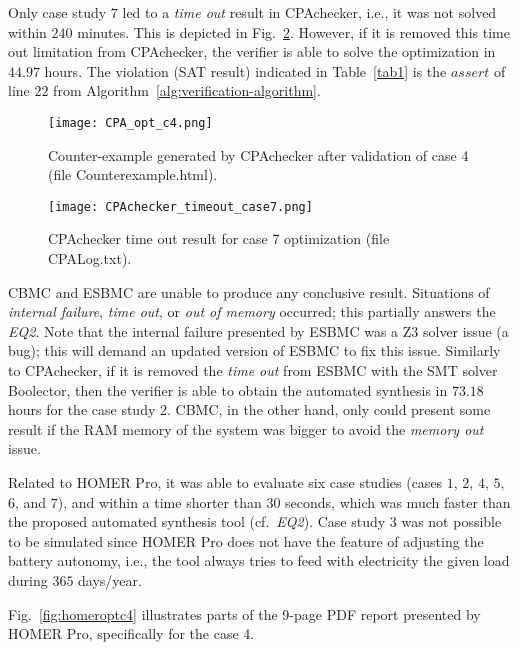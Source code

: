 Only case study $7$ led to a \textit{time out} result in CPAchecker, i.e., 
it was not solved within $240$ minutes. This is depicted in Fig.~\ref{fig:cpaoptcase7}. However, if it is removed this time out limitation from CPAchecker, the verifier is 
able to solve the optimization in $44.97$ hours. 
The violation (SAT result) indicated in Table~\ref{tab1} 
is the $assert$ of line $22$ from Algorithm~\ref{alg:verification-algorithm}. %

\begin{figure}[h]
\texttt{[image: CPA\_opt\_c4.png]}
\centering
\caption{Counter-example generated by CPAchecker after validation of case 4 (file Counterexample.html).}
\label{fig:CPAoptc1}
\end{figure}

\begin{figure}[h]
\texttt{[image: CPAchecker\_timeout\_case7.png]}
\centering
\caption{CPAchecker time out result for case 7 optimization (file CPALog.txt).}
\label{fig:cpaoptcase7}
\end{figure}

CBMC and ESBMC are unable to produce any conclusive result. 
Situations of \textit{internal failure}, \textit{time out}, 
or \textit{out of memory} occurred; this partially answers 
the \textit{EQ2}. Note that the internal failure presented 
by ESBMC was a Z3 solver issue (a bug); this will demand 
an updated version of ESBMC to fix this issue. Similarly to CPAchecker, 
if it is removed the \textit{time out} from ESBMC with the SMT solver Boolector, 
then the verifier is able to obtain the automated synthesis 
in $73.18$ hours for the case study $2$. CBMC, in the other hand, only could present some result if the RAM memory of the system was bigger to avoid the \textit{memory out} issue.

Related to HOMER Pro, it was able to evaluate six case studies (cases $1$, $2$, $4$, $5$, $6$, and $7$), and within a time shorter than $30$ seconds, which was much 
faster than the proposed automated synthesis tool (cf.~\textit{EQ2}). 
Case study $3$ was not possible to be simulated since HOMER Pro 
does not have the feature of adjusting the battery autonomy, i.e., 
the tool always tries to feed with electricity the given load 
during $365$ days/year. 

Fig.~\ref{fig:homeroptc4} illustrates parts of the 9-page PDF report presented by HOMER Pro, specifically for the case 4.

